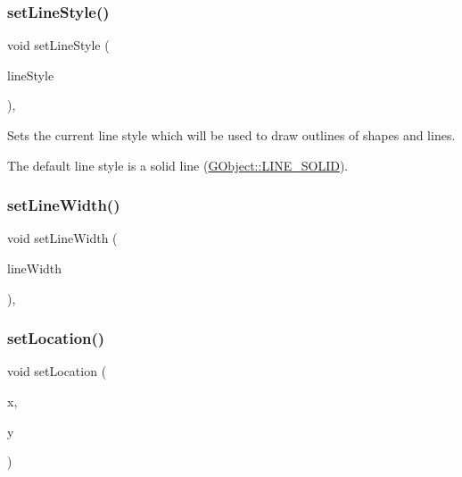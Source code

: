 \subsubsection{\texorpdfstring{set\+Line\+Style()}{setLineStyle()}}
{\footnotesize\ttfamily void set\+Line\+Style (\begin{DoxyParamCaption}\item[{\mbox{\hyperlink{classGObject_a86e0f5648542856159bb40775c854aa7}{G\+Object\+::\+Line\+Style}}}]{line\+Style }\end{DoxyParamCaption})\hspace{0.3cm}{\ttfamily [virtual]}, {\ttfamily [inherited]}}



Sets the current line style which will be used to draw outlines of shapes and lines. 

The default line style is a solid line (\mbox{\hyperlink{classGObject_a86e0f5648542856159bb40775c854aa7a700c78bc2cd76acaab26651bf7b4941f}{G\+Object\+::\+L\+I\+N\+E\+\_\+\+S\+O\+L\+ID}}). \mbox{\label{classGForwardDrawingSurface_ad4c1188c73080ceb06795ff34ae34860}} 
\subsubsection{\texorpdfstring{set\+Line\+Width()}{setLineWidth()}}
{\footnotesize\ttfamily void set\+Line\+Width (\begin{DoxyParamCaption}\item[{double}]{line\+Width }\end{DoxyParamCaption})\hspace{0.3cm}{\ttfamily [override]}, {\ttfamily [inherited]}}

\mbox{\label{classGWindow_a04594e8ba9b98513a64f1da00dcae18c}} 
\subsubsection{\texorpdfstring{set\+Location()}{setLocation()}\hspace{0.1cm}{\footnotesize\ttfamily [1/2]}}
{\footnotesize\ttfamily void set\+Location (\begin{DoxyParamCaption}\item[{double}]{x,  }\item[{double}]{y }\end{DoxyParamCaption})\hspace{0.3cm}{\ttfamily [virtual]}}



